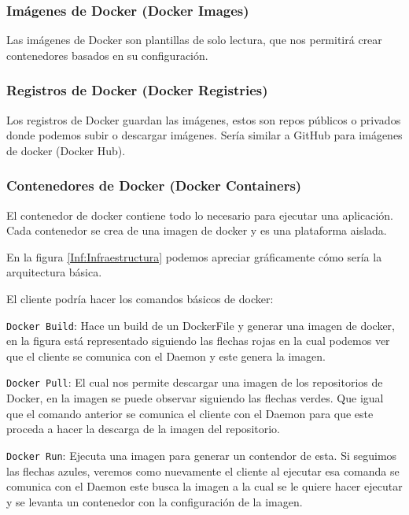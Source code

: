 \subsubsection{Imágenes de Docker (Docker Images)}

Las imágenes de Docker son plantillas de solo lectura, que nos permitirá crear contenedores basados en su configuración.

\subsubsection{Registros de Docker (Docker Registries)}

Los registros de Docker guardan las imágenes, estos son repos públicos o privados donde podemos subir o descargar imágenes. Sería similar a GitHub para imágenes de docker (Docker Hub).

\subsubsection{Contenedores de Docker (Docker Containers)}

El contenedor de docker contiene todo lo necesario para ejecutar una aplicación. Cada contenedor se crea de una imagen de docker y es una plataforma aislada.
\newline

En la figura \ref{Inf:Infraestructura} podemos apreciar gráficamente cómo sería la arquitectura básica. 

El cliente podría hacer los comandos básicos de docker:

\texttt{Docker Build}: Hace un build de un DockerFile y generar una imagen de docker, en la figura está representado siguiendo las flechas rojas en la cual podemos ver que el cliente se comunica con el Daemon y este genera la imagen. 

\texttt{Docker Pull}: El cual nos permite descargar una imagen de los repositorios de Docker, en la imagen se puede observar siguiendo las flechas verdes. Que igual que el comando anterior se comunica el cliente con el Daemon para que este proceda a hacer la descarga de la imagen del repositorio. 

\texttt{Docker Run}: Ejecuta una imagen para generar un contendor de esta. Si seguimos las flechas azules, veremos como nuevamente el cliente al ejecutar esa comanda se comunica con el Daemon este busca la imagen a la cual se le quiere hacer ejecutar y se levanta un contenedor con la configuración de la imagen.


